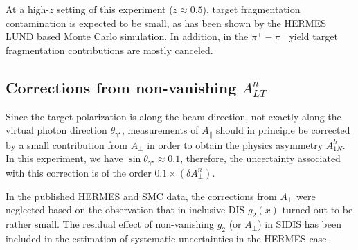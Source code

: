  At a high-$z$ setting of this experiment ($z \approx 0.5$), target fragmentation contamination is 
expected to be small, as has been shown by the HERMES LUND based Monte Carlo simulation. In addition, in the
$\pi^+ - \pi^-$ yield target fragmentation contributions are mostly canceled.


\subsection{Corrections from non-vanishing $A^n_{LT}$}   
Since the target polarization is along the beam direction, not exactly along the
virtual photon  direction $\theta_{\gamma^{\star}}$, measurements of
$A_{\parallel}$ should in principle be corrected by a small contribution from $A_{\perp}$
in order to obtain the physics asymmetry $A_{1N}^h$.  
In this experiment, we have  $\sin \theta_{\gamma^{\star}} \approx 0.1$, therefore,
the uncertainty associated with this correction is of the order $0.1 \times (\delta A^n_{\perp})$. 

In the published HERMES and SMC data, the corrections from $A_{\perp}$ were neglected based on
the observation that in inclusive DIS $g_2(x)$ turned out to be rather small.  The residual
effect of non-vanishing $g_2$ (or $A_{\perp}$) in SIDIS has been included in the 
estimation of systematic uncertainties in the HERMES case. 


